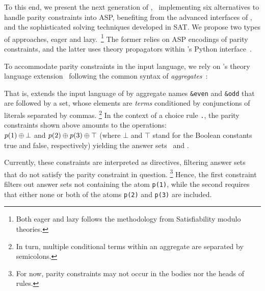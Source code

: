 \documentclass[letterpaper]{article} %
\begin{document}
 To this end, we present the next generation of \xorro,~\cite{DBLP:conf/lpnmr/EverardoJKS19}
 implementing six alternatives to handle parity constraints into ASP,
 benefiting from the advanced interfaces of \clingo{},
 and the sophisticated solving techniques developed in SAT.
 We propose two types of approaches, eager and lazy.~\footnote{Both eager and lazy follows the methodology from Satisfiability modulo theories.}
 The former relies on ASP encodings of parity constraints, and the latter uses theory propagators within \clingo{}’s Python interface~\cite{DBLP:conf/iclp/GebserKKOSW16}.
 
 To accommodate parity constraints in the input language,
 we rely on \clingo’s theory language extension~\cite{DBLP:conf/iclp/GebserKKOSW16}
 following the common syntax of \emph{aggregates}~\cite{DBLP:journals/tplp/GebserHKLS15}:
 
 That is, \xorro{} extends the input language of \clingo{} by
 aggregate names \texttt{\&even} and \texttt{\&odd} that are followed
 by a set, whose elements are \emph{terms} conditioned by
 conjunctions of literals separated by commas.%
 \footnote{In turn, multiple conditional terms within an aggregate are
 	separated by semicolons.}
 In the context of a choice rule \texttt{.}, the parity constraints shown above
 amounts to the \XOR{} operations: \\
 $p(1) \oplus \bot$ and $p(2) \oplus p(3) \oplus \top$
 (where $\bot$ and $\top$ stand for the Boolean constants true and false, respectively)
 yielding the answer sets~\texttt{} and \texttt{}.
 
 
 Currently, these constraints are interpreted as directives,
 filtering answer sets that do not satisfy the parity constraint in question.
 \footnote{For now, parity constraints may not occur in the bodies nor the heads of rules.}
 Hence, the first
 constraint filters out answer sets not containing the atom
 \texttt{p(1)}, while the second requires that either none or both of
 the atoms \texttt{p(2)} and \texttt{p(3)} are included.
 
\end{document}
